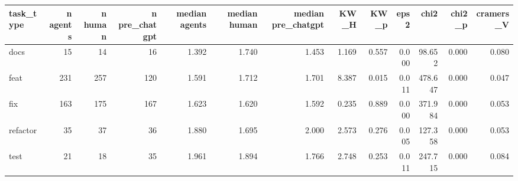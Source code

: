 \begin{tabular}{lrrrrrrrrrrrr}
\toprule
task_type & n agents & n human & n pre_chatgpt & median agents & median human & median pre_chatgpt & KW_H & KW_p & eps2 & chi2 & chi2_p & cramers_V \\
\midrule
docs & 15 & 14 & 16 & 1.392 & 1.740 & 1.453 & 1.169 & 0.557 & 0.000 & 98.652 & 0.000 & 0.080 \\
feat & 231 & 257 & 120 & 1.591 & 1.712 & 1.701 & 8.387 & 0.015 & 0.011 & 478.647 & 0.000 & 0.047 \\
fix & 163 & 175 & 167 & 1.623 & 1.620 & 1.592 & 0.235 & 0.889 & 0.000 & 371.984 & 0.000 & 0.053 \\
refactor & 35 & 37 & 36 & 1.880 & 1.695 & 2.000 & 2.573 & 0.276 & 0.005 & 127.358 & 0.000 & 0.053 \\
test & 21 & 18 & 35 & 1.961 & 1.894 & 1.766 & 2.748 & 0.253 & 0.011 & 247.715 & 0.000 & 0.084 \\
\bottomrule
\end{tabular}
